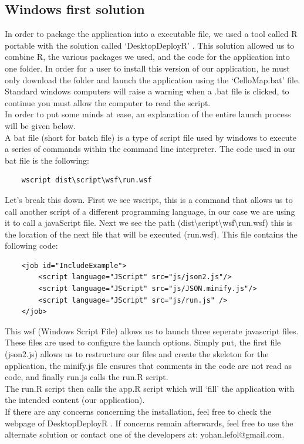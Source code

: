 \documentclass[11pt]{article}
\begin{document}
\subsection{Windows first solution\label{win_1}}
In order to package the application into a executable file, we used a tool called R portable \cite{R_portable} with the solution called `DesktopDeployR' \cite{Deploy_R_Shiny}. This solution allowed us to combine R, the various packages we used, and the code for the application into one folder. In order for a user to install this version of our application, he must only download the folder and launch the application using the `CelloMap.bat' file. Standard windows computers will raise a warning when a .bat file is clicked, to continue you must allow the computer to read the script.\\
In order to put some minds at ease, an explanation of the entire launch process will be given below.\\
A bat file (short for batch file) is a type of script file used by windows to execute a series of commands within the command line interpreter. The code used in our bat file is the following:
\lstset{language=C++}
\begin{lstlisting}
	wscript dist\script\wsf\run.wsf
\end{lstlisting}
Let's break this down. First we see wscript, this is a command that allows us to call another script of a different programming language, in our case we are using it to call a javaScript file. Next we see the path (dist\textbackslash script\textbackslash wsf\textbackslash run.wsf) this is the location of the next file that will be executed (run.wsf). This file contains the following code:
\lstset{language=Java}
\begin{lstlisting}
	<job id="IncludeExample">
   		<script language="JScript" src="js/json2.js"/>
   		<script language="JScript" src="js/JSON.minify.js"/>
   		<script language="JScript" src="js/run.js" />
	</job>
\end{lstlisting}
This \acrshort{wsf} (Windows Script File) allows us to launch three seperate javascript files. These files are used to configure the launch options. Simply put, the first file (json2.js) allows us to restructure our files and create the skeleton for the application, the minify.js file ensures that comments in the code are not read as code, and finally run.js calls the run.R script.\\
The run.R script then calls the app.R script which will `fill' the application with the intended content (our application).\\
If there are any concerns concerning the installation, feel free to check the webpage of DesktopDeployR \cite{Deploy_R_Shiny}. If concerns remain afterwards, feel free to use the alternate solution or contact one of the developers at: yohan.lefol@gmail.com.
\end{document}
